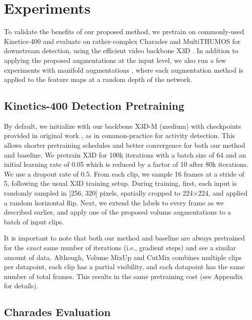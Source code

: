 \documentclass[letterpaper]{article} \usepackage{aaai23}  \usepackage{times}  \usepackage{helvet}  \usepackage{courier}  \usepackage[hyphens]{url}  \usepackage{graphicx} \urlstyle{rm} \def\UrlFont{\rm}  \usepackage{natbib}  \usepackage{caption} \frenchspacing  \setlength{\pdfpagewidth}{8.5in}  \setlength{\pdfpageheight}{11in}  \usepackage{algorithm}
\newcommand{\ch}{}
\begin{document}
\section{Experiments}
\label{sec:results}

To validate the benefits of our proposed method, we pretrain on commonly-used Kinetics-400 \cite{carreira2017quo} and evaluate on rather-complex Charades \cite{sigurdsson2016hollywood} and MultiTHUMOS \cite{yeung2018every} for downstream detection, using the efficient video backbone X3D \cite{feichtenhofer2020x3d}. In addition to applying the proposed augmentations at the input level, we also run a few experiments with manifold augmentations \cite{verma2019manifold}, where each augmentation method is applied to the feature maps at a random depth of the network.

\subsection{Kinetics-400 Detection Pretraining}


By default, we initialize with our backbone X3D-M (medium) with checkpoints provided in original work \cite{feichtenhofer2020x3d}, \ch{as in common-practice for activity detection. This allows shorter pretraining schedules and better convergence for both our method and baseline.} We pretrain X3D for 100k iterations with a batch size of 64 and an initial learning rate of 0.05 which is reduced by a factor of 10 after 80k iterations. We use a dropout rate of 0.5. From each clip, we sample 16 frames at a stride of 5, following the usual X3D training setup. During training, first, each input is randomly sampled in [256, 320] pixels, spatially cropped to 224$\times$224, and applied a random horizontal flip. Next, we extend the labels to every frame as we described earlier, and apply one of the proposed volume augmentations to a batch of input clips. 

\ch{It is important to note that both our method and baseline are always pretrained for the \textit{exact} same number of iterations (i.e., gradient steps) and see a similar amount of data. Although, Volume MixUp and CutMix combines multiple clips per datapoint, each clip has a partial visibility, and each datapoint has the same number of total frames. This results in the same pretraining cost (see Appendix for details).}

\subsection{Charades Evaluation}
\label{subsec:charades}
\end{document}

